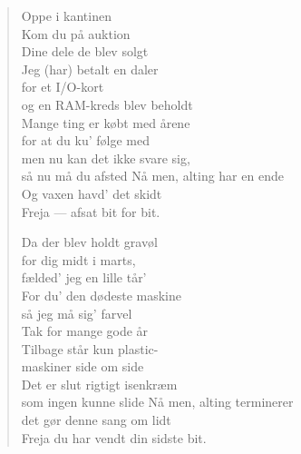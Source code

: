 \documentclass[a4paper,11pt]{article}
\begin{document}
\begin{sketch}
\begin{verse}
\vskip 8mm
Oppe i kantinen\\
Kom du på auktion\\
Dine dele de blev solgt\\
Jeg (har) betalt en daler\\
for et I/O-kort\\
og en RAM-kreds blev beholdt\\
Mange ting er købt med årene\\
for at du ku' følge med\\
men nu kan det ikke svare sig,\\
så nu må du afsted
\vskip 8mm
Nå men, alting har en ende\\
Og vaxen havd' det skidt\\
Freja --- afsat bit for bit.

\vskip 8mm
Da der blev holdt gravøl\\
for dig midt i marts,\\
fælded' jeg en lille tår'\\
For du' den dødeste maskine\\
så jeg må sig' farvel\\
Tak for mange gode år\\
Tilbage står kun plastic-\\
maskiner side om side\\
Det er slut rigtigt isenkræm\\
som ingen kunne slide
\vskip 8mm
Nå men, alting terminerer\\
det gør denne sang om lidt\\
Freja du har vendt din sidste bit.

\end{verse}
\end{sketch}
\end{document}

